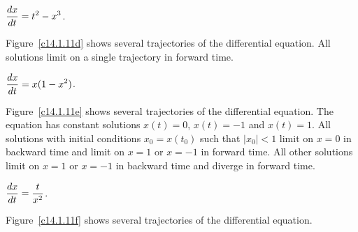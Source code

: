 \documentclass{ximera}
\begin{document}
\begin{exercise} \label{c14.1.11d}
$\displaystyle\frac{dx}{dt} = t^2 - x^3$.

\begin{solution}
Figure~\ref{c14.1.11d} shows several trajectories of the
differential equation.  All solutions limit on a single trajectory in
forward time.

\begin{figure}[htb]
                       \centerline{%
                       }
\end{figure}

\end{solution}
\end{exercise}
\begin{exercise} \label{c14.1.11e}
$\displaystyle\frac{dx}{dt} = x(1-x^2)$.

\begin{solution}
Figure~\ref{c14.1.11e} shows several trajectories of the
differential equation.  The equation has constant solutions $x(t) = 0$,
$x(t) = -1$ and $x(t) = 1$.  All solutions with initial conditions
$x_0 = x(t_0)$ such that $|x_0| < 1$ limit on $x = 0$ in backward time and
limit on $x = 1$ or $x = -1$ in forward time.  All other solutions limit
on $x = 1$ or $x = -1$ in backward time and diverge in forward time.

\begin{figure}[htb]
                       \centerline{%
                       }
\end{figure}


\end{solution}
\end{exercise}
\begin{exercise} \label{c14.1.11f}
$\displaystyle\frac{dx}{dt} = \frac{t}{x^2}$.

\begin{solution}
Figure~\ref{c14.1.11f} shows several trajectories of the
differential equation.

\begin{figure}[htb]
                       \centerline{%
                       }
\end{figure}

\end{solution}
\end{exercise}
\end{document}
